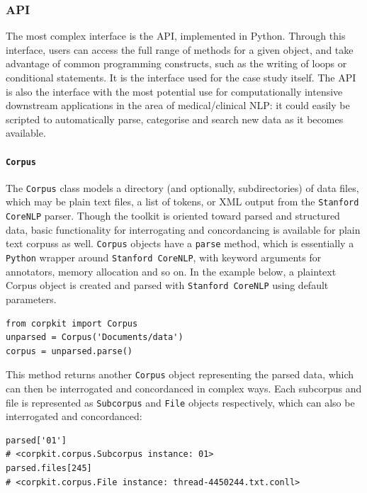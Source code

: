 \subsubsection{API}

The most complex interface is the \gls{API}, implemented in Python. Through this interface, users can access the full range of methods for a given object, and take advantage of common programming constructs, such as the writing of loops or conditional statements. It is the interface used for the case study itself. The \gls{API} is also the interface with the most potential use for computationally intensive downstream applications in the area of medical\slash clinical \gls{NLP}: it could easily be scripted to automatically parse, categorise and search new data as it becomes available.

\paragraph{\texttt{Corpus}}

The \texttt{Corpus} class models a directory (and optionally, subdirectories) of data files, which may be plain text files, a list of tokens, or \gls{XML} output from the \texttt{Stanford CoreNLP} parser. Though the toolkit is oriented toward parsed and structured data, basic functionality for interrogating and concordancing is available for plain text \glspl{corpus} as well. \texttt{Corpus} objects have a \texttt{parse} method, which is essentially a \texttt{Python} wrapper around \texttt{Stanford CoreNLP}, with keyword arguments for annotators, memory allocation and so on. In the example below, a plaintext Corpus object is created and parsed with \texttt{Stanford CoreNLP} using default parameters.

\begin{verbatim}
from corpkit import Corpus
unparsed = Corpus('Documents/data')
corpus = unparsed.parse()
\end{verbatim} 
%
This method returns another \texttt{Corpus} object representing the parsed data, which can then be interrogated and concordanced in complex ways. Each subcorpus and file is represented as \texttt{Subcorpus} and \texttt{File} objects respectively, which can also be interrogated and concordanced:

\begin{verbatim}
parsed['01']
# <corpkit.corpus.Subcorpus instance: 01>
parsed.files[245]
# <corpkit.corpus.File instance: thread-4450244.txt.conll>
\end{verbatim}

